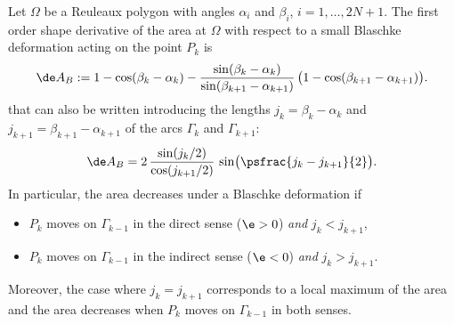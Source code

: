 \begin{proposition}\label{prop4}
Let $\Omega$ be a Reuleaux polygon with angles $\alpha_i$ and $\beta_i$, $i=1,\ldots, 2N+1$.
The first order shape derivative of the area at $\Omega$ with respect to a small Blaschke deformation acting on the point $P_k$ is
\[
\de A_B:=
1-\cos(\beta_k-\alpha_k) - \frac{\sin(\beta_k-\alpha_k)}{\sin(\beta_{k+1}-\alpha_{k+1})}\, \big(1- \cos(\beta_{k+1} - \alpha_{k+1})\big).
\]
that can also be written introducing the lengths $j_k=\beta_k-\alpha_k$ and $j_{k+1}=\beta_{k+1}
-\alpha_{k+1}$ of the arcs
$\Gamma_k$ and $\Gamma_{k+1}$:
\[
\de A_B=2\, \frac{\sin(j_k/2)}{\cos(j_{k+1}/2)}\,\sin\bigl(\psfrac{j_k-j_{k+1}}{2}\bigr).
\]
In particular, the area decreases under a Blaschke deformation if
\begin{itemize}
\item $P_k$ moves on $\Gamma_{k-1}$ in the direct sense ($\e>0$) \emph{and} $j_k<j_{k+1}$,
\item $P_k$ moves on $\Gamma_{k-1}$ in the indirect sense ($\e<0$) \emph{and} $j_k>j_{k+1}$.
\end{itemize}
Moreover, the case where $j_k=j_{k+1}$ corresponds to a local maximum of the area and the area decreases when $P_k$ moves on $\Gamma_{k-1}$ in both senses.
\end{proposition}

